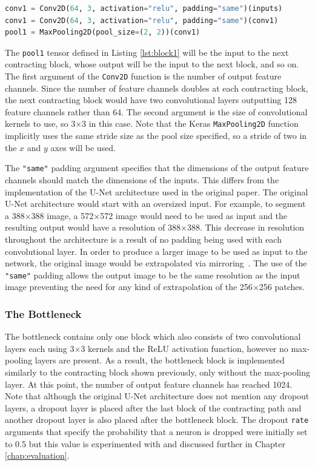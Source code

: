 \begin{lstlisting}[float={!t},caption={The implementation of the first contracting block of the U-Net architecture using the Keras functional API.},label={lst:block1},language=Python,upquote=true,belowskip=0pt]
conv1 = Conv2D(64, 3, activation="relu", padding="same")(inputs)
conv1 = Conv2D(64, 3, activation="relu", padding="same")(conv1)
pool1 = MaxPooling2D(pool_size=(2, 2))(conv1)
\end{lstlisting}
The \texttt{pool1} tensor defined in Listing \ref{lst:block1} will be the input to the next contracting block, whose output will be the input to the next block, and so on. The first argument of the \texttt{Conv2D} function is the number of output feature channels. Since the number of feature channels doubles at each contracting block, the next contracting block would have two convolutional layers outputting 128 feature channels rather than 64. The second argument is the size of convolutional kernels to use, so 3$\times$3 in this case. Note that the Keras \texttt{MaxPooling2D} function implicitly uses the same stride size as the pool size specified, so a stride of two in the $x$ and $y$ axes will be used.

The \texttt{"{}same"{}} padding argument specifies that the dimensions of the output feature channels should match the dimensions of the inputs. This differs from the implementation of the U-Net architecture used in the original paper. The original U-Net architecture would start with an oversized input. For example, to segment a 388$\times$388 image, a 572$\times$572 image would need to be used as input and the resulting output would have a resolution of 388$\times$388. This decrease in resolution throughout the architecture is a result of no padding being used with each convolutional layer. In order to produce a larger image to be used as input to the network, the original image would be extrapolated via mirroring~\cite{ronneberger2015u}. The use of the \texttt{"{}same"{}} padding allows the output image to be the same resolution as the input image preventing the need for any kind of extrapolation of the 256$\times$256 patches.

\subsubsection{The Bottleneck}

The bottleneck contains only one block which also consists of two convolutional layers each using 3$\times$3 kernels and the ReLU activation function, however no max-pooling layers are present. As a result, the bottleneck block is implemented similarly to the contracting block shown previously, only without the max-pooling layer. At this point, the number of output feature channels has reached 1024. Note that although the original U-Net architecture does not mention any dropout layers, a dropout layer is placed after the last block of the contracting path and another dropout layer is also placed after the bottleneck block. The dropout \texttt{rate} arguments that specify the probability that a neuron is dropped were initially set to 0.5 but this value is experimented with and discussed further in Chapter \ref{chap:evaluation}.


